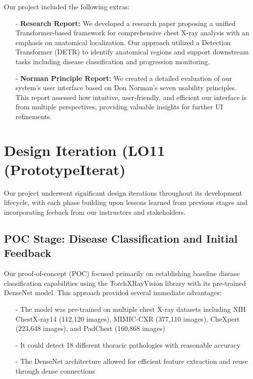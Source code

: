 \documentclass{article}
\begin{document}
Our project included the following extras:

\begin{itemize}
    \item[-] \textbf{Research Report:} We developed a research paper proposing a unified Transformer-based framework for comprehensive chest X-ray analysis with an emphasis on anatomical localization. Our approach utilized a Detection Transformer (DETR) to identify anatomical regions and support downstream tasks including disease classification and progression monitoring.
    
    \item[-] \textbf{Norman Principle Report:} We created a detailed evaluation of our system's user interface based on Don Norman's seven usability principles. This report assessed how intuitive, user-friendly, and efficient our interface is from multiple perspectives, providing valuable insights for further UI refinements.

\end{itemize}


\section{Design Iteration (LO11 (PrototypeIterat)}

Our project underwent significant design iterations throughout its development lifecycle, with each phase building upon lessons learned from previous stages and incorporating feeback from our instructors and stakeholders.

\subsection{POC Stage: Disease Classification and Initial Feedback}

Our proof-of-concept (POC) focused primarily on establishing baseline disease classification capabilities using the TorchXRayVision library with its pre-trained DenseNet model. This approach provided several immediate advantages:

\begin{itemize}
    \item[-] The model was pre-trained on multiple chest X-ray datasets including NIH ChestX-ray14 (112,120 images), MIMIC-CXR (377,110 images), CheXpert (223,648 images), and PadChest (160,868 images)
    \item[-] It could detect 18 different thoracic pathologies with reasonable accuracy
    \item[-] The DenseNet architecture allowed for efficient feature extraction and reuse through dense connections
\end{itemize}
\end{document}
